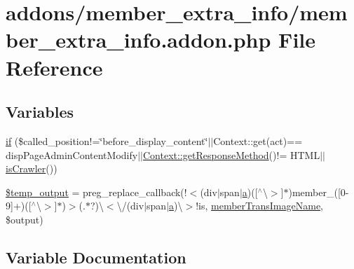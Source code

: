 \hypertarget{member__extra__info_8addon_8php}{}\section{addons/member\+\_\+extra\+\_\+info/member\+\_\+extra\+\_\+info.addon.\+php File Reference}
\label{member__extra__info_8addon_8php}
\subsection*{Variables}
\begin{DoxyCompactItemize}
\item 
\hyperlink{member__extra__info_8addon_8php_a29031816e50a8f742422e671b2bef9b2}{if} (\$called\+\_\+position!=\char`\"{}before\+\_\+display\+\_\+content\char`\"{}$\vert$$\vert$Context\+::get(\textquotesingle{}act\textquotesingle{})== \textquotesingle{}disp\+Page\+Admin\+Content\+Modify\textquotesingle{}$\vert$$\vert$\hyperlink{classContext_a1d02a15209360034cd719d8b08cb5061}{Context\+::get\+Response\+Method}()!= \textquotesingle{}H\+T\+ML\textquotesingle{}$\vert$$\vert$\hyperlink{func_8inc_8php_a490ffbd4821da1995c76c381553d5b3d}{is\+Crawler}())
\item 
\hyperlink{member__extra__info_8addon_8php_a5866ef6f77cbeaf87d8208cf805bbc3d}{\$temp\+\_\+output} = preg\+\_\+replace\+\_\+callback(\textquotesingle{}!$<$(div$\vert$span$\vert$\hyperlink{jqplot_8barRenderer_8min_8js_a15f14caa0c9de3a415d8eb9d88378fc0}{a})(\mbox{[}$^\wedge$\textbackslash{}$>$\mbox{]}$\ast$)member\+\_\+(\mbox{[}0-\/9\mbox{]}+)(\mbox{[}$^\wedge$\textbackslash{}$>$\mbox{]}$\ast$)$>$(.$\ast$?)\textbackslash{}$<$\textbackslash{}/(div$\vert$span$\vert$\hyperlink{jqplot_8barRenderer_8min_8js_a15f14caa0c9de3a415d8eb9d88378fc0}{a})\textbackslash{}$>$!is\textquotesingle{}, \textquotesingle{}\hyperlink{member__extra__info_8lib_8php_a21882e797e0da66aed32f1cf3053eaf2}{member\+Trans\+Image\+Name}\textquotesingle{}, \$output)
\end{DoxyCompactItemize}


\subsection{Variable Documentation}
